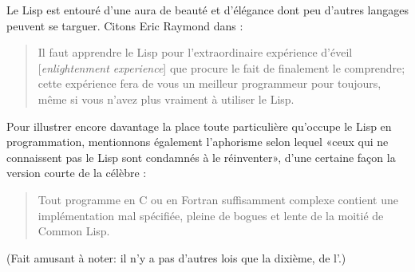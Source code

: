 Le Lisp est entouré d'une aura de beauté et d'élégance dont peu
d'autres langages peuvent se targuer. Citons Eric Raymond dans
:
\begin{quote}
  Il faut apprendre le Lisp pour l'extraordinaire expérience d'éveil
  [\emph{enlightenment experience}] que procure le fait de finalement
  le comprendre; cette expérience fera de vous un meilleur programmeur
  pour toujours, même si vous n'avez plus vraiment à utiliser le Lisp.
\end{quote}

Pour illustrer encore davantage la place toute particulière qu'occupe
le Lisp en programmation, mentionnons également l'aphorisme selon
lequel «ceux qui ne connaissent pas le Lisp sont condamnés à le
réinventer», d'une certaine façon la version courte de la célèbre
: %
\begin{quote}
  Tout programme en C ou en Fortran suffisamment complexe contient une
  implémentation mal spécifiée, pleine de bogues et lente de la moitié
  de Common Lisp.
\end{quote}
(Fait amusant à noter: il n'y a pas d'autres lois que la dixième, de
l'.)

